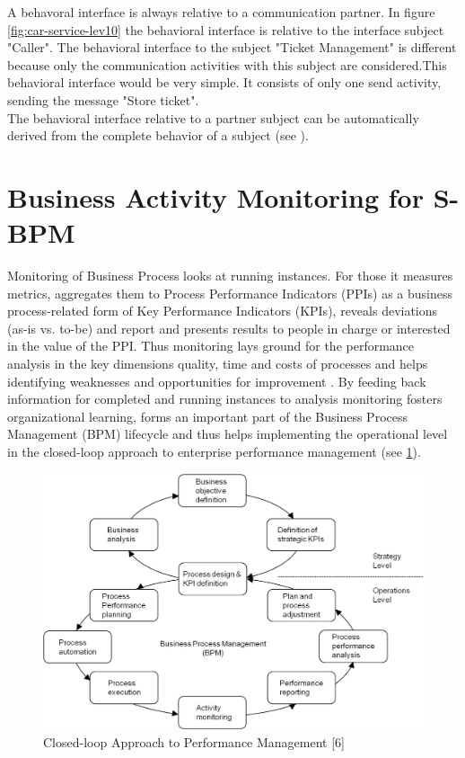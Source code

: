 A behavoral interface is always relative to a communication partner. In figure \ref{fig:car-service-lev10} the behavioral interface is relative to the interface subject "Caller". The behavioral interface to the subject "Ticket Management" is different because only the communication activities with this subject are considered.This behavioral interface would be very simple. It consists of only one send activity, sending the message "Store ticket".\\
The behavioral interface relative to a partner subject can be automatically derived from the complete behavior of a subject
(see \cite{article:jCPEX}).


\section{Business Activity Monitoring for S-BPM}

Monitoring of Business Process looks at running instances. For those it measures metrics, aggregates them to Process Performance Indicators (PPIs) as a business process-related form of Key Performance Indicators (KPIs), reveals deviations (as-is vs. to-be) and report and presents results to people in charge or interested in the value of the PPI. Thus monitoring lays ground for the performance analysis in the key dimensions quality, time and costs of processes and helps identifying weaknesses and opportunities for improvement \cite{book:UntPerform}.
By feeding back information for completed and running instances to analysis monitoring fosters organizational learning, forms an important part of the Business Process Management (BPM) lifecycle \cite{article:SUbjetorientiertBPM} and thus helps implementing the operational level in the closed-loop approach to enterprise performance management \cite{book:processmonitoring} (see \ref{fig:Approach-Performance}).

\begin{figure}[h]
	\centering
	\includegraphics[width=0.9\linewidth]{Figures/Chapter5/Monitoring/Approach-Performance-Mgmt.jpg}
	\caption[Closed-loop Approach to Performance Management]{Closed-loop Approach to Performance Management [6]}
	\label{fig:Approach-Performance}
\end{figure}




